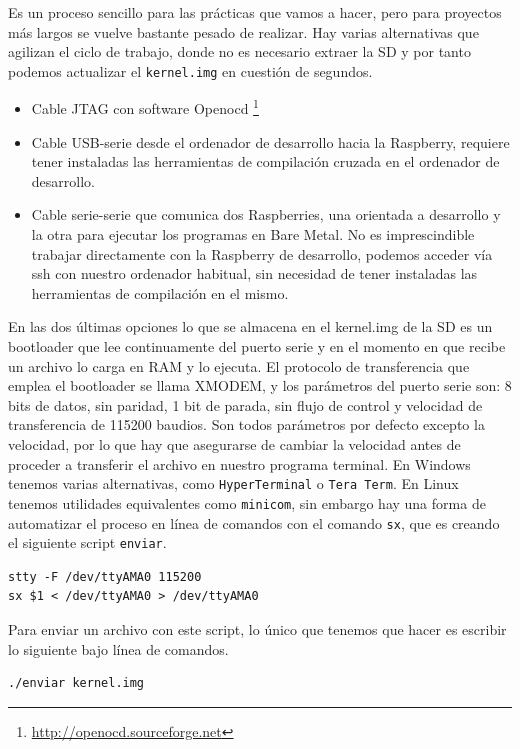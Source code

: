 Es un proceso sencillo para las prácticas que vamos a hacer, pero para proyectos más largos
se vuelve bastante pesado de realizar. Hay varias alternativas que agilizan el ciclo de
trabajo, donde no es necesario extraer la SD y por tanto podemos actualizar el {\tt kernel.img}
en cuestión de segundos.

\begin{itemize}
  \item Cable JTAG con software Openocd \footnote{\url{http://openocd.sourceforge.net}}
  \item Cable USB-serie desde el ordenador de desarrollo hacia la Raspberry, requiere
        tener instaladas las herramientas de compilación cruzada en el ordenador de desarrollo.
  \item Cable serie-serie que comunica dos Raspberries, una orientada a desarrollo y la otra
        para ejecutar los programas en Bare Metal. No es imprescindible trabajar directamente
        con la Raspberry de desarrollo, podemos acceder vía ssh con nuestro ordenador habitual,
        sin necesidad de tener instaladas las herramientas de compilación en el mismo.
\end{itemize}

En las dos últimas opciones lo que se almacena en el kernel.img de la SD es un bootloader
que lee continuamente del puerto serie y en el momento en que recibe un archivo lo carga
en RAM y lo ejecuta. El protocolo de transferencia que emplea el bootloader se llama XMODEM,
y los parámetros del puerto serie son: 8 bits de datos, sin paridad, 1 bit de parada, sin
flujo de control y velocidad de transferencia de 115200 baudios. Son todos parámetros por
defecto excepto la velocidad, por lo que hay que asegurarse de cambiar la velocidad antes
de proceder a transferir el archivo en nuestro programa terminal. En Windows tenemos varias
alternativas, como {\tt HyperTerminal} o {\tt Tera Term}. En Linux tenemos utilidades equivalentes
como {\tt minicom}, sin embargo hay una forma de automatizar el proceso en línea de comandos
con el comando {\tt sx}, que es creando el siguiente script {\tt enviar}.

\begin{lstlisting}
stty -F /dev/ttyAMA0 115200
sx $1 < /dev/ttyAMA0 > /dev/ttyAMA0
\end{lstlisting}

Para enviar un archivo con este script, lo único que tenemos que hacer es escribir lo siguiente
bajo línea de comandos.

\begin{lstlisting}
./enviar kernel.img
\end{lstlisting}

